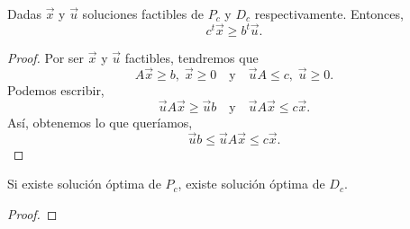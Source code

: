 \documentclass{report}
\begin{document}
\begin{theorem}
Dadas $\displaystyle \vec{x} $ y $\displaystyle \vec{u} $ soluciones factibles de $\displaystyle P_{c} $ y $\displaystyle D_{c} $ respectivamente. Entonces, 
\[c^{t}\vec{x}\geq b^{t}\vec{u} .\]
\end{theorem}
\begin{proof}
Por ser $\displaystyle \vec{x} $ y $\displaystyle \vec{u} $ factibles, tendremos que 
\[A\vec{x}\geq b, \; \vec{x}\geq 0 \quad \text{y} \quad \vec{u}A \leq c, \; \vec{u}\geq 0 .\]
Podemos escribir,
\[\vec{u}A\vec{x}\geq \vec{u}b \quad \text{y} \quad \vec{u}A\vec{x}\leq c\vec{x} .\]
Así, obtenemos lo que queríamos,
\[\vec{u}b \leq \vec{u}A\vec{x}\leq c\vec{x} .\]
\end{proof}
\begin{prop}
Si existe solución óptima de $\displaystyle P_{c} $, existe solución óptima de $\displaystyle D_{c} $. 
\end{prop}
\begin{proof}

\end{proof}
\end{document}
